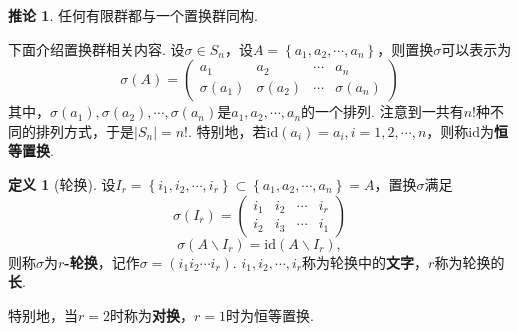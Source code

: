 \documentclass[12pt]{ctexart}
\theoremstyle{definition}
\newtheorem{definition}{定义}
\newtheorem{corollary}{推论}
\theoremstyle{plain}
\newcommand{\id}{\mathrm{id}}
\begin{document}
	\begin{corollary}
		任何有限群都与一个置换群同构.
	\end{corollary}
	下面介绍置换群相关内容. 设$\sigma\in S_n$，设$A=\left\{a_1,a_2,\cdots,a_n\right\}$，则置换$\sigma$可以表示为
	$$\sigma(A)=
	\begin{pmatrix}
		a_1 & a_2 & \cdots & a_n \\
		\sigma(a_1) & \sigma(a_2) & \cdots & \sigma(a_n)
	\end{pmatrix}
	$$
	其中，$\sigma(a_1),\sigma(a_2),\cdots,\sigma(a_n)$是$a_1,a_2,\cdots,a_n$的一个排列. 注意到一共有$n!$种不同的排列方式，于是$|S_n|=n!$. 特别地，若$\id(a_i)=a_i,i=1,2,\cdots,n$，则称$\id$为\textbf{恒等置换}.
	\begin{definition}[轮换]
		设$I_r=\left\{i_1,i_2,\cdots,i_r\right\}\subset\left\{a_1,a_2,\cdots,a_n\right\}=A$，置换$\sigma$满足
		$$\sigma(I_r)=
		\begin{pmatrix}
			i_1 & i_2 & \cdots & i_r \\
			i_2 & i_3 & \cdots & i_1
		\end{pmatrix}
		$$
		$$\sigma(A\backslash I_r)=\id(A\backslash I_r),$$
		则称$\sigma$为\textbf{$r$-轮换}，记作$\sigma=(i_1i_2\cdots i_r)$. $i_1,i_2,\cdots,i_r$称为轮换中的\textbf{文字}，$r$称为轮换的\textbf{长}.
	\end{definition}
	特别地，当$r=2$时称为\textbf{对换}，$r=1$时为恒等置换.
	
\end{document}
